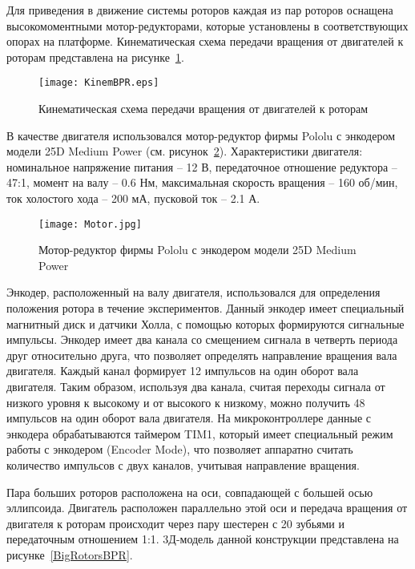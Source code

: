 Для приведения в движение системы роторов каждая из пар роторов оснащена высокомоментными мотор-редукторами, которые установлены в соответствующих опорах на платформе. Кинематическая схема передачи вращения от двигателей к роторам представлена на рисунке~\ref{KinemBPR}.

\begin{figure}[h]
	\centering
	\texttt{[image: KinemBPR.eps]}%
	\caption{Кинематическая схема передачи вращения от двигателей к роторам}
	\label{KinemBPR}
\end{figure}

В качестве двигателя использовался мотор-редуктор фирмы Pololu с энкодером модели 25D Medium Power (см. рисунок~\ref{MotorBPR}). Характеристики двигателя: номинальное напряжение питания -- 12 В, передаточное отношение редуктора -- 47:1, момент на валу -- 0.6 Нм, максимальная скорость вращения -- 160 об/мин, ток холостого хода -- 200 мА, пусковой ток -- 2.1 А. 

\begin{figure}[h]
	\centering
	\texttt{[image: Motor.jpg]}%
	\caption{Мотор-редуктор фирмы Pololu с энкодером модели 25D Medium Power}
	\label{MotorBPR}
\end{figure}

Энкодер, расположенный на валу двигателя, использовался для определения положения ротора в течение экспериментов. Данный энкодер имеет специальный магнитный диск и датчики Холла, с помощью которых формируются сигнальные импульсы. Энкодер имеет два канала со смещением сигнала в четверть периода друг относительно друга, что позволяет определять направление вращения вала двигателя. Каждый канал формирует 12 импульсов на один оборот вала двигателя. Таким образом, используя два канала, считая переходы сигнала от низкого уровня к высокому и от высокого к низкому, можно получить 48 импульсов на один оборот вала двигателя. На микроконтроллере данные с энкодера обрабатываются таймером TIM1, который имеет специальный режим работы с энкодером (Encoder Mode), что позволяет аппаратно считать количество импульсов с двух каналов, учитывая направление вращения. 



Пара больших роторов расположена на оси, совпадающей с большей осью эллипсоида. Двигатель расположен параллельно этой оси и передача вращения от двигателя к роторам происходит через пару шестерен с 20 зубьями и передаточным отношением 1:1. 3Д-модель данной конструкции представлена на рисунке~\ref{BigRotorsBPR}.

